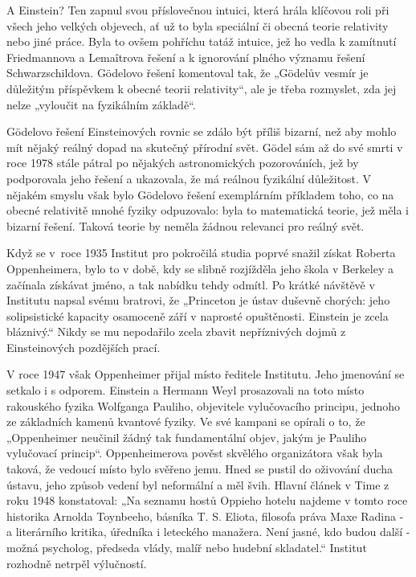   A Einstein? Ten zapnul svou příslovečnou intuici, která hrála klíčovou roli při všech jeho velkých
  objevech, ať už to byla speciální či obecná teorie relativity nebo jiné práce. Byla to ovšem
  pohříchu tatáž intuice, jež ho vedla k zamítnutí Friedmannova a Lemaîtrova řešení a k ignorování
  plného významu řešení Schwarzschildova. Gödelovo řešení komentoval tak, že „Gödelův vesmír je
  důležitým příspěvkem k obecné teorii relativity“, ale je třeba rozmyslet, zda jej nelze „vyloučit
  na fyzikálním základě“. 
  
  Gödelovo řešení Einsteinových rovnic se zdálo být příliš bizarní, než aby mohlo mít nějaký reálný
  dopad na skutečný přírodní svět. Gödel sám až do své smrti v roce 1978 stále pátral po nějakých
  astronomických pozorováních, jež by podporovala jeho řešení a ukazovala, že má reálnou fyzikální
  důležitost. V nějakém smyslu však bylo Gödelovo řešení exemplárním příkladem toho, co na obecné
  relativitě mnohé fyziky odpuzovalo: byla to matematická teorie, jež měla i bizarní řešení. Taková
  teorie by neměla žádnou relevanci pro reálný svět. 
  
  Když se v roce 1935 Institut pro pokročilá studia poprvé snažil získat Roberta Oppenheimera, bylo
  to v době, kdy se slibně rozjížděla jeho škola v Berkeley a začínala získávat jméno, a tak nabídku
  tehdy odmítl. Po krátké návštěvě v Institutu napsal svému bratrovi, že „Princeton je ústav duševně
  chorých: jeho solipsistické kapacity osamoceně září v naprosté opuštěnosti. Einstein je zcela
  bláznivý.“ Nikdy se mu nepodařilo zcela zbavit nepříznivých dojmů z Einsteinových pozdějších
  prací. 
  
  V roce 1947 však Oppenheimer přijal místo ředitele Institutu. Jeho jmenování se setkalo i s
  odporem. Einstein a Hermann Weyl prosazovali na toto místo rakouského fyzika Wolfganga Pauliho,
  objevitele vylučovacího principu, jednoho ze základních kamenů kvantové fyziky. Ve své kampani se
  opírali o to, že „Oppenheimer neučinil žádný tak fundamentální objev, jakým je Pauliho vylučovací
  princip“. Oppenheimerova pověst skvělého organizátora však byla taková, že vedoucí místo bylo
  svěřeno jemu. Hned se pustil do oživování ducha ústavu, jeho způsob vedení byl neformální a měl
  švih. Hlavní článek v Time z roku 1948 konstatoval: „Na seznamu hostů Oppieho hotelu najdeme v
  tomto roce historika Arnolda Toynbeeho, básníka T. S. Eliota, filosofa práva Maxe Radina - a
  literárního kritika, úředníka i leteckého manažera. Není jasné, kdo budou další - možná psycholog,
  předseda vlády, malíř nebo hudební skladatel.“ Institut rozhodně netrpěl výlučností. 
  
